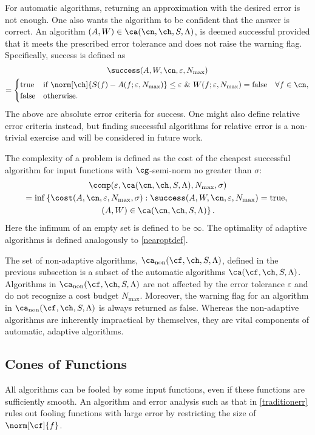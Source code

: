 \documentclass[]{elsarticle}
\DeclareMathOperator{\fix}{non}
\theoremstyle{definition}
\theoremstyle{remark}
\begin{document}
For automatic algorithms, returning an approximation with the desired error is not enough.  One also wants the algorithm to be confident that the answer is correct.  An  algorithm  $(A,W) \in \ca(\cn,\ch,S,\Lambda)$, is deemed successful provided that it meets the prescribed error tolerance and does not raise the warning flag.  Specifically, success is defined as
\begin{multline*}
\success(A,W,\cn,\varepsilon,N_{\max}) \\
= \begin{cases} \text{true} & \text{if } \displaystyle \norm[\ch]{S(f)-A(f;\varepsilon,N_{\max})} \le \varepsilon \ \& \ W(f;\varepsilon,N_{\max})=\text{false} \quad \forall  f \in \cn, \\
\displaystyle \text{false} & \text{otherwise}.
\end{cases}
\end{multline*}
The above are absolute error criteria for success.  One might also define relative error criteria instead, but finding successful algorithms for relative error is a non-trivial exercise and will be considered in future work.

The complexity of a problem is defined as the cost of the cheapest successful algorithm for input functions with $\cg$-semi-norm no greater than $\sigma$:
\begin{multline} \label{complexdef}
\comp(\varepsilon,\ca(\cn,\ch,S,\Lambda),N_{\max},\sigma) \\
 = \inf\left\{\cost(A,\cn,\varepsilon,N_{\max},\sigma) : \success(A,W,\cn,\varepsilon,N_{\max}) = \text{true}, \right .\\
\left.  (A,W) \in \ca(\cn,\ch,S,\Lambda) \right \}.
\end{multline}
Here the infimum of an empty set is defined to be $\infty$.  The optimality of adaptive algorithms is defined analogously to \eqref{nearoptdef}.

The set of non-adaptive algorithms, $\ca_{\fix}(\cf,\ch,S,\Lambda)$, defined in the previous subsection is a subset of the automatic algorithms $\ca(\cf,\ch,S,\Lambda)$.  Algorithms in $\ca_{\fix}(\cf,\ch,S,\Lambda)$ are not affected by the error tolerance $\varepsilon$ and do not recognize a cost budget $N_{\max}$.  Moreover, the warning flag for an algorithm in $\ca_{\fix}(\cf,\ch,S,\Lambda)$ is always returned as false.  Whereas the non-adaptive algorithms are inherently impractical by themselves, they are vital components of automatic, adaptive algorithms.

\subsection{Cones of Functions} \label{conesubsec} All algorithms can be fooled by some input functions, even if these functions are sufficiently smooth.  An algorithm and error analysis such as that in \eqref{traditionerr} rules out fooling functions with large error by restricting the size of  $\norm[\cf]{f}$.  
\end{document}
